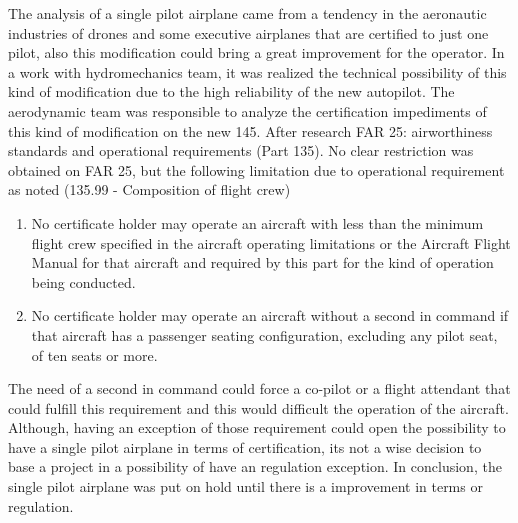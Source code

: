 The analysis of a single pilot airplane came from a tendency in the aeronautic industries of drones and some executive airplanes that are certified to just one pilot, also this modification could bring a great improvement for the operator.
	In a work with hydromechanics team, it was realized the technical possibility of this kind of modification due to the high reliability of the new autopilot. The aerodynamic team was responsible to analyze the certification impediments of this kind of modification on the new 145.
	After research FAR 25: airworthiness standards and operational requirements (Part 135). No clear restriction was obtained on FAR 25, but the following limitation due to operational requirement as noted (135.99 - Composition of flight crew)


\begin{enumerate}
  \item No certificate holder may operate an aircraft with less than the minimum flight crew specified in the aircraft operating limitations or the Aircraft Flight Manual for that aircraft and required by this part for the kind of operation being conducted.
  \item No certificate holder may operate an aircraft without a second in command if that aircraft has a passenger seating configuration, excluding any pilot seat, of ten seats or more.
\end{enumerate}


	The need of a second in command could force a co-pilot or a flight attendant that could fulfill this requirement and this would difficult the operation of the aircraft. Although, having an exception of those requirement could open the possibility to have a single pilot airplane in terms of certification, its not a wise decision to base a project in a possibility of have an regulation exception.
	In conclusion, the single pilot airplane was put on hold until there is a improvement in terms or regulation.
